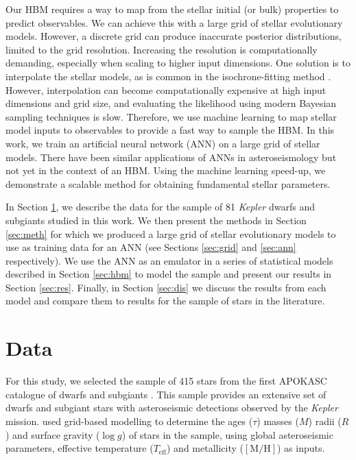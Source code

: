 \documentclass[a4paper,fleqn,usenatbib]{mnras}
\newcommand{\metallicity}{\ensuremath{[\mathrm{M}/\mathrm{H}]}}
\newcommand{\teff}{\ensuremath{T_\mathrm{eff}}}
\begin{document}
Our HBM requires a way to map from the stellar initial (or bulk) properties to predict observables. We can achieve this with a large grid of stellar evolutionary models. However, a discrete grid can produce inaccurate posterior distributions, limited to the grid resolution. Increasing the resolution is computationally demanding, especially when scaling to higher input dimensions. One solution is to interpolate the stellar models, as is common in the isochrone-fitting method \citep[see e.g.][]{Berger.Huber.ea2020}. However, interpolation can become computationally expensive at high input dimensions and grid size, and evaluating the likelihood using modern Bayesian sampling techniques is slow. Therefore, we use machine learning to map stellar model inputs to observables to provide a fast way to sample the HBM. In this work, we train an artificial neural network (ANN) on a large grid of stellar models. There have been similar applications of ANNs in asteroseismology \citep{Verma.Hanasoge.ea2016, Hendriks.Aerts2019} but not yet in the context of an HBM. Using the machine learning speed-up, we demonstrate a scalable method for obtaining fundamental stellar parameters.

In Section \ref{sec:data}, we describe the data for the sample of 81 \emph{Kepler} dwarfs and subgiants studied in this work. We then present the methods in Section \ref{sec:meth} for which we produced a large grid of stellar evolutionary models to use as training data for an ANN (see Sections \ref{sec:grid} and \ref{sec:ann} respectively). We use the ANN as an emulator in a series of statistical models described in Section \ref{sec:hbm} to model the sample and present our results in Section \ref{sec:res}. Finally, in Section \ref{sec:dis} we discuss the results from each model and compare them to results for the sample of stars in the literature.

\section{Data}\label{sec:data}


For this study, we selected the sample of 415 stars from the first APOKASC catalogue of dwarfs and subgiants \citep[][hereafter ]{Serenelli.Johnson.ea2017}. This sample provides an extensive set of dwarfs and subgiant stars with asteroseismic detections observed by the \emph{Kepler} mission.  used grid-based modelling to determine the ages ($\tau$) masses ($M$) radii ($R$) and surface gravity ($\log g$) of stars in the sample, using global asteroseismic parameters, effective temperature ($\teff$) and metallicity ($\metallicity$) as inputs. 
\end{document}
